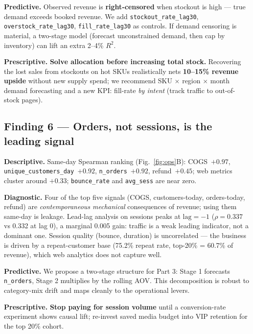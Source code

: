\documentclass[10pt,a4paper,twocolumn]{article}
\newcommand{\keyfact}[1]{\textcolor{accent}{\textbf{#1}}}
\newcommand{\lever}[1]{\textcolor{warn}{\textbf{#1}}}
\begin{document}
\textbf{Predictive.} Observed revenue is \keyfact{right-censored} when stockout is high --- true demand exceeds booked revenue. We add \texttt{stockout\_rate\_lag30}, \texttt{overstock\_rate\_lag30}, \texttt{fill\_rate\_lag30} as controls. If demand censoring is material, a two-stage model (forecast unconstrained demand, then cap by inventory) can lift an extra 2--4\% $R^2$.

\textbf{Prescriptive.} \lever{Solve allocation before increasing total stock.} Recovering the lost sales from stockouts on hot SKUs realistically nets \keyfact{10--15\% revenue upside} without new supply spend; we recommend SKU $\times$ region $\times$ month demand forecasting and a new KPI: fill-rate \emph{by intent} (track traffic to out-of-stock pages).

\subsection{Finding 6 --- Orders, not sessions, is the leading signal}

\textbf{Descriptive.} Same-day Spearman ranking (Fig.~\ref{fig:ops}B): COGS~$+0.97$, \texttt{unique\_customers\_day}~$+0.92$, \texttt{n\_orders}~$+0.92$, refund~$+0.45$; web metrics cluster around $+0.33$; \texttt{bounce\_rate} and \texttt{avg\_sess} are near zero.

\textbf{Diagnostic.} Four of the top five signals (COGS, customers-today, orders-today, refund) are \emph{contemporaneous mechanical} consequences of revenue; using them same-day is leakage. Lead-lag analysis on sessions peaks at $\text{lag}{=}-1$ ($\rho{=}0.337$ vs 0.332 at lag 0), a marginal 0.005 gain: traffic is a weak leading indicator, not a dominant one. Session quality (bounce, duration) is uncorrelated --- the business is driven by a repeat-customer base (75.2\% repeat rate, top-20\% = 60.7\% of revenue), which web analytics does not capture well.

\textbf{Predictive.} We propose a two-stage structure for Part 3: Stage 1 forecasts \texttt{n\_orders}, Stage 2 multiplies by the rolling AOV. This decomposition is robust to category-mix drift and maps cleanly to the operational levers.

\textbf{Prescriptive.} \lever{Stop paying for session volume} until a conversion-rate experiment shows causal lift; re-invest saved media budget into VIP retention for the top 20\% cohort.

\end{document}

